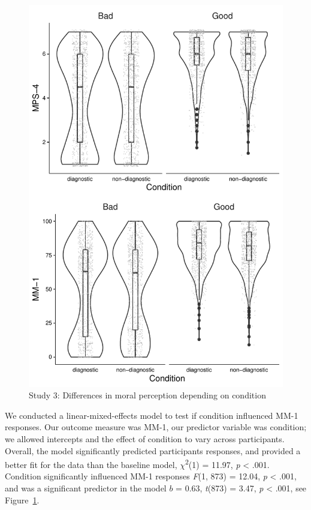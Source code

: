 \documentclass[
  english,
  man,floatsintext]{apa7}
\begin{document}
\begin{figure}
\centering
\includegraphics{moral_dilution_in_chunks_files/figure-latex/S3bothconditionplot-1.pdf}
\caption{\label{fig:S3bothconditionplot}Study 3: Differences in moral perception depending on condition}
\end{figure}

We conducted a linear-mixed-effects model to test if condition influenced MM-1 responses. Our outcome measure was MM-1, our predictor variable was condition; we allowed intercepts and the effect of condition to vary across participants. Overall, the model significantly predicted participants responses, and provided a better fit for the data than the baseline model, \(\chi\)\textsuperscript{2}(1) = 11.97, \emph{p} \textless{} .001. Condition significantly influenced MM-1 responses \emph{F}(1, 873) = 12.04, \emph{p} \textless{} .001, and was a significant predictor in the model \(b\) = 0.63, \emph{t}(873) = 3.47, \emph{p} \textless{} .001, see Figure~\ref{fig:S3bothconditionplot}.
\end{document}
